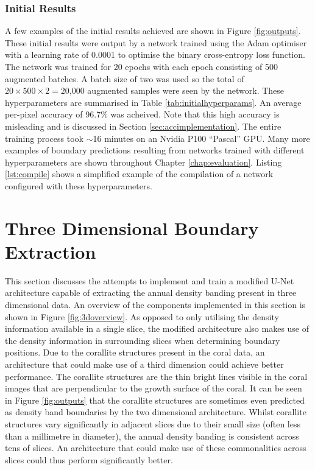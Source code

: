 \subsubsection{Initial Results}

A few examples of the initial results achieved are shown in Figure \ref{fig:outputs}. These initial results were output by a network trained using the Adam optimiser~\cite{adam} with a learning rate of 0.0001 to optimise the binary cross-entropy loss function. The network was trained for 20 epochs with each epoch consisting of 500 augmented batches. A batch size of two was used so the total of $20\times500\times2=\text{20,000}$ augmented samples were seen by the network. These hyperparameters are summarised in Table \ref{tab:initialhyperparams}. An average per-pixel accuracy of 96.7\% was acheived. Note that this high accuracy is misleading and is discussed in Section \ref{sec:accimplementation}. The entire training process took ${\sim}$16 minutes on an Nvidia P100 ``Pascal'' GPU. Many more examples of boundary predictions resulting from networks trained with different hyperparameters are shown throughout Chapter \ref{chap:evaluation}. Listing \ref{lst:compile} shows a simplified example of the compilation of a network configured with these hyperparameters.

\section{Three Dimensional Boundary Extraction}
\label{sec:threedimension}

This section discusses the attempts to implement and train a modified U-Net architecture capable of extracting the annual density banding present in three dimensional data. An overview of the components implemented in this section is shown in Figure \ref{fig:3doverview}. As opposed to only utilising the density information available in a single slice, the modified architecture also makes use of the density information in surrounding slices when determining boundary positions. Due to the corallite structures present in the coral data, an architecture that could make use of a third dimension could achieve better performance. The corallite structures are the thin bright lines visible in the coral images that are perpendicular to the growth surface of the coral. It can be seen in Figure \ref{fig:outputs} that the corallite structures are sometimes even predicted as density band boundaries by the two dimensional architecture. Whilst corallite structures vary significantly in adjacent slices due to their small size (often less than a millimetre in diameter), the annual density banding is consistent across tens of slices. An architecture that could make use of these commonalities across slices could thus perform significantly better.

